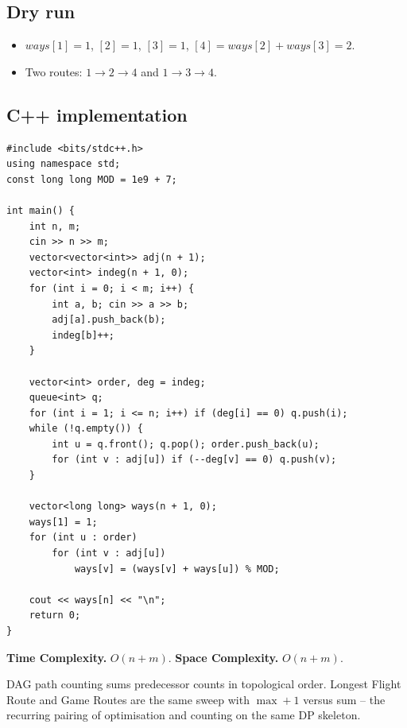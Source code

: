 \subsection*{Dry run}


\begin{itemize}
  \item $\textit{ways}[1]=1$, $[2]=1$, $[3]=1$, $[4]=\textit{ways}[2]+
        \textit{ways}[3]=2$.
  \item Two routes: $1\to2\to4$ and $1\to3\to4$.
\end{itemize}

\subsection*{C++ implementation}

\begin{lstlisting}
#include <bits/stdc++.h>
using namespace std;
const long long MOD = 1e9 + 7;

int main() {
    int n, m;
    cin >> n >> m;
    vector<vector<int>> adj(n + 1);
    vector<int> indeg(n + 1, 0);
    for (int i = 0; i < m; i++) {
        int a, b; cin >> a >> b;
        adj[a].push_back(b);
        indeg[b]++;
    }

    vector<int> order, deg = indeg;
    queue<int> q;
    for (int i = 1; i <= n; i++) if (deg[i] == 0) q.push(i);
    while (!q.empty()) {
        int u = q.front(); q.pop(); order.push_back(u);
        for (int v : adj[u]) if (--deg[v] == 0) q.push(v);
    }

    vector<long long> ways(n + 1, 0);
    ways[1] = 1;
    for (int u : order)
        for (int v : adj[u])
            ways[v] = (ways[v] + ways[u]) % MOD;

    cout << ways[n] << "\n";
    return 0;
}
\end{lstlisting}

\begin{complexitybox}
\textbf{Time Complexity.} $O(n+m)$. \textbf{Space Complexity.} $O(n+m)$.
\end{complexitybox}

\begin{takeawaybox}
DAG path counting sums predecessor counts in topological order. Longest
Flight Route and Game Routes are the same sweep with $\max{+}1$ versus
sum -- the recurring pairing of optimisation and counting on the same DP
skeleton.
\end{takeawaybox}
